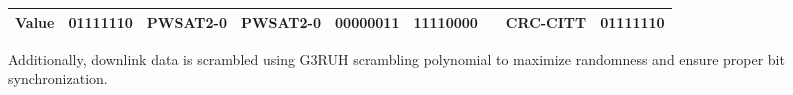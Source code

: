 \begin{table}
\begin{tabular}{l|c|c|c|c|c|c|c|c|}
\hline
\multicolumn{1}{|c|}{Value}                                                    & 01111110               & PWSAT2-0                                                     & PWSAT2-0                                                & 00000011                                              & 11110000                                                     & {\cellcolor[rgb]{0.753,0.753,0.753}}                                                                                                                  & CRC-CITT                                                                         & 01111110               \\
\hline
\end{tabular}
\end{table}


Additionally, downlink data is scrambled using G3RUH scrambling polynomial to maximize randomness and ensure proper bit synchronization.
